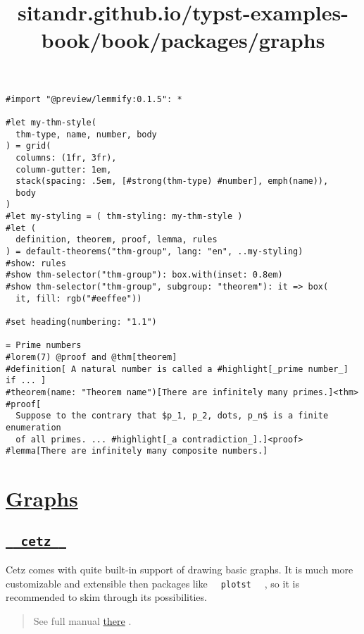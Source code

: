 \begin{verbatim}
#import "@preview/lemmify:0.1.5": *

#let my-thm-style(
  thm-type, name, number, body
) = grid(
  columns: (1fr, 3fr),
  column-gutter: 1em,
  stack(spacing: .5em, [#strong(thm-type) #number], emph(name)),
  body
)
#let my-styling = ( thm-styling: my-thm-style )
#let (
  definition, theorem, proof, lemma, rules
) = default-theorems("thm-group", lang: "en", ..my-styling)
#show: rules
#show thm-selector("thm-group"): box.with(inset: 0.8em)
#show thm-selector("thm-group", subgroup: "theorem"): it => box(
  it, fill: rgb("#eeffee"))

#set heading(numbering: "1.1")

= Prime numbers
#lorem(7) @proof and @thm[theorem]
#definition[ A natural number is called a #highlight[_prime number_] if ... ]
#theorem(name: "Theorem name")[There are infinitely many primes.]<thm>
#proof[
  Suppose to the contrary that $p_1, p_2, dots, p_n$ is a finite enumeration
  of all primes. ... #highlight[_a contradiction_].]<proof>
#lemma[There are infinitely many composite numbers.]
\end{verbatim}

\pandocbounded{}


\title{sitandr.github.io/typst-examples-book/book/packages/graphs}

\section{\texorpdfstring{\hyperref[graphs]{Graphs}}{Graphs}}\label{graphs}

\subsection{\texorpdfstring{\hyperref[cetz]{\texttt{\ }{\texttt{\ cetz\ }}\texttt{\ }}}{  cetz  }}\label{cetz}

Cetz comes with quite built-in support of drawing basic graphs. It is
much more customizable and extensible then packages like
\texttt{\ }{\texttt{\ plotst\ }}\texttt{\ } , so it is recommended to
skim through its possibilities.

\begin{quote}
See full manual
\href{https://github.com/johannes-wolf/cetz/blob/master/manual.pdf?raw=true}{there}
.
\end{quote}

